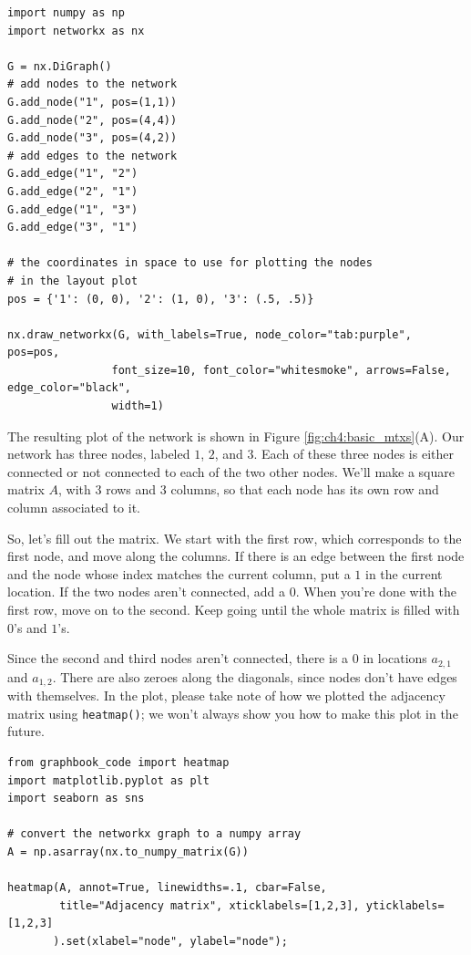 \begin{lstlisting}[style=python]
import numpy as np
import networkx as nx

G = nx.DiGraph()
# add nodes to the network
G.add_node("1", pos=(1,1))
G.add_node("2", pos=(4,4))
G.add_node("3", pos=(4,2))
# add edges to the network
G.add_edge("1", "2")
G.add_edge("2", "1")
G.add_edge("1", "3")
G.add_edge("3", "1")

# the coordinates in space to use for plotting the nodes
# in the layout plot
pos = {'1': (0, 0), '2': (1, 0), '3': (.5, .5)}

nx.draw_networkx(G, with_labels=True, node_color="tab:purple", pos=pos,
                font_size=10, font_color="whitesmoke", arrows=False, edge_color="black",
                width=1)
\end{lstlisting}

The resulting plot of the network is shown in Figure \ref{fig:ch4:basic_mtxs}(A). Our network has three nodes, labeled $1$, $2$, and $3$. Each of these three nodes is either connected or not connected to each of the two other nodes. We'll make a square matrix $A$, with 3 rows and 3 columns, so that each node has its own row and column associated to it.

So, let's fill out the matrix. We start with the first row, which corresponds to the first node, and move along the columns. If there is an edge between the first node and the node whose index matches the current column, put a $1$ in the current location. If the two nodes aren't connected, add a $0$. When you're done with the first row, move on to the second. Keep going until the whole matrix is filled with $0$'s and $1$'s. 

Since the second and third nodes aren't connected, there is a $0$ in locations $a_{2, 1}$ and $a_{1, 2}$. There are also zeroes along the diagonals, since nodes don't have edges with themselves. In the plot, please take note of how we plotted the adjacency matrix using \texttt{heatmap()}; we won't always show you how to make this plot in the future. 

\begin{lstlisting}[style=python]
from graphbook_code import heatmap
import matplotlib.pyplot as plt
import seaborn as sns

# convert the networkx graph to a numpy array
A = np.asarray(nx.to_numpy_matrix(G))

heatmap(A, annot=True, linewidths=.1, cbar=False, 
        title="Adjacency matrix", xticklabels=[1,2,3], yticklabels=[1,2,3]
       ).set(xlabel="node", ylabel="node");


\end{lstlisting}

